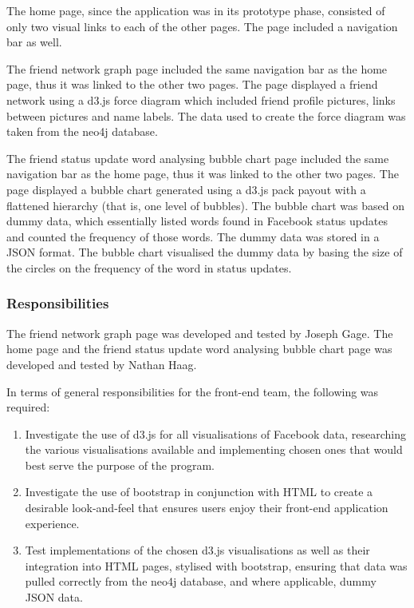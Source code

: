 \documentclass[10pt,onecolumn]{article}
\begin{document}
The home page, since the application was in its prototype phase, consisted of only two visual links to each of the other pages. The page included a navigation bar as well. 

The friend network graph page included the same navigation bar as the home page, thus it was linked to the other two pages. The page displayed a friend network using a d3.js force diagram which included friend profile pictures, links between pictures and name labels. The data used to create the force diagram was taken from the neo4j database. 

The friend status update word analysing bubble chart page included the same navigation bar as the home page, thus it was linked to the other two pages. The page displayed a bubble chart generated using a d3.js pack payout with a flattened hierarchy (that is, one level of bubbles). The bubble chart was based on dummy data, which essentially listed words found in Facebook status updates and counted the frequency of those words. The dummy data was stored in a JSON format. The bubble chart visualised the dummy data by basing the size of the circles on the frequency of the word in status updates. 

\subsubsection{Responsibilities}
The friend network graph page was developed and tested by Joseph Gage. The home page and the friend status update word analysing bubble chart page was developed and tested by Nathan Haag.

In terms of general responsibilities for the front-end team, the following was required:

\begin{enumerate}
	\item Investigate the use of d3.js for all visualisations of Facebook data, researching the various visualisations available and implementing chosen ones that would best serve the purpose of the program. 
	\item Investigate the use of bootstrap in conjunction with HTML to create a desirable look-and-feel that ensures users enjoy their front-end application experience. 
	\item Test implementations of the chosen d3.js visualisations as well as their integration into HTML pages, stylised with bootstrap, ensuring that data was pulled correctly from the neo4j database, and where applicable, dummy JSON data.  
\end{enumerate}
\end{document}
